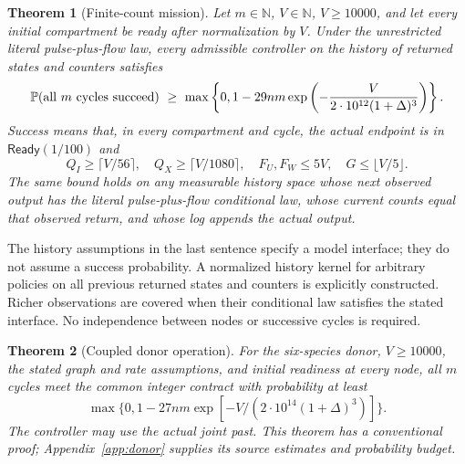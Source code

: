 \documentclass[11pt]{article}
\newtheorem{theorem}{Theorem}
\theoremstyle{definition}\newtheorem{definition}[theorem]{Definition}
\newcommand{\N}{\mathbb N}
\newcommand{\Ready}{\mathsf{Ready}}
\newcommand{\Law}{\mathbb P}
\begin{document}
\begin{theorem}[Finite-count mission]\label{thm:mission}
Let $m\in\N$, $V\in\N$, $V\ge10000$, and let every initial compartment be ready after normalization
by $V$. Under the unrestricted literal pulse-plus-flow law, every admissible controller
on the history of returned states and counters satisfies
\begin{equation}\label{eq:mission}
\Law(\hbox{all $m$ cycles succeed})\ \ge\
\max\left\{0,1-29nm\exp\left(-\frac{V}{2\cdot10^{12}(1+\Delta)^3}\right)\right\}.
\end{equation}
Success means that, in every compartment and cycle, the actual endpoint is in
$\Ready(1/100)$ and
\begin{equation}\label{eq:integer}
Q_I\ge\lceil V/56\rceil,\quad Q_X\ge\lceil V/1080\rceil,\quad
F_U,F_W\le5V,\quad G\le\lfloor V/5\rfloor.
\end{equation}
The same bound holds on any measurable history space whose next observed output has
the literal pulse-plus-flow conditional law, whose current counts equal that observed
return, and whose log appends the actual output.
\end{theorem}

The history assumptions in the last sentence specify a model interface; they do not
assume a success probability. A normalized history kernel for arbitrary policies on all
previous returned states and counters is explicitly constructed. Richer observations
are covered when their conditional law satisfies the stated interface. No independence
between nodes or successive cycles is required.

\begin{theorem}[Coupled donor operation]\label{thm:donor}
For the six-species donor, $V\ge10000$, the stated graph and rate assumptions,
and initial readiness at every node, all $m$ cycles meet the common integer
contract with probability at least
\[
\max\{0,1-27nm\exp[-V/(2\cdot10^{14}(1+\Delta)^3)]\}.
\]
The controller may use the actual joint past. This theorem has a conventional
proof; Appendix~\ref{app:donor} supplies its source estimates and probability budget.
\end{theorem}
\end{document}

